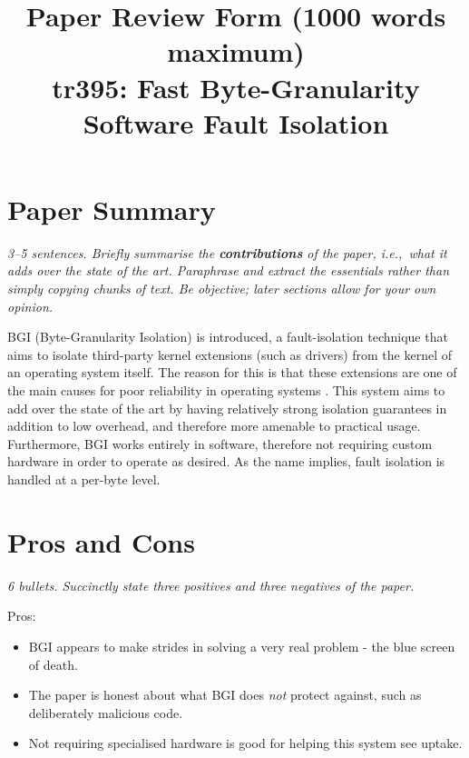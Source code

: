 \documentclass[11pt]{article}
\begin{document}

\title{Paper Review Form (1000 words maximum)\\
    tr395: Fast Byte-Granularity Software Fault Isolation \cite{BGI}}

\maketitle

\section*{Paper Summary}

\textsl{3--5 sentences. Briefly summarise the {\bf contributions} of the paper,
i.e.,~what it adds over the state of the art. Paraphrase and extract the
essentials rather than simply copying chunks of text. Be objective; later
sections allow for your own opinion.}

BGI (Byte-Granularity Isolation) is introduced, a fault-isolation technique
that aims to isolate third-party kernel extensions (such as drivers) from the
kernel of an operating system itself. The reason for this is that these
extensions are one of the main causes for poor reliability in operating systems
\cite{OSErrors}. This system aims to add over the state of the art by having
relatively strong isolation guarantees in addition to low overhead, and
therefore more amenable to practical usage. Furthermore, BGI works entirely in
software, therefore not requiring custom hardware in order to operate as
desired. As the name implies, fault isolation is handled at a per-byte level.


\section*{Pros and Cons}

\textsl{6 bullets. Succinctly state three positives and three negatives of the
paper.}

Pros:

\begin{itemize}

    \item BGI appears to make strides in solving a very real problem - the blue
    screen of death.

    \item The paper is honest about what BGI does \textit{not} protect against,
    such as deliberately malicious code.

    \item Not requiring specialised hardware is good for helping this system
    see uptake.

\end{itemize}
\end{document}
